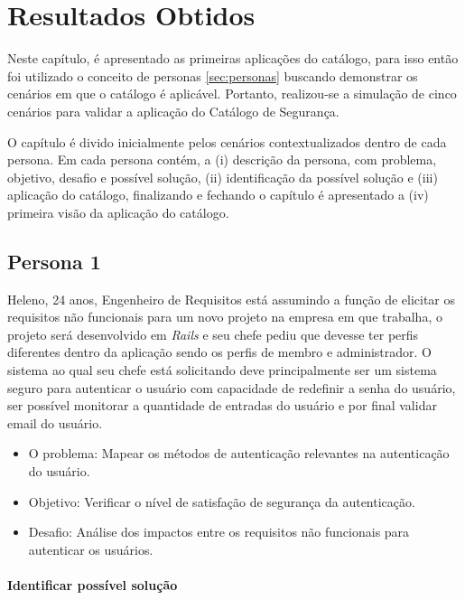 \chapter{Resultados Obtidos}
\label{chap:resultados obtidos}

Neste capítulo, é apresentado as primeiras aplicações do catálogo, para isso então foi utilizado o conceito de personas \ref{sec:personas} buscando demonstrar os cenários em que o catálogo é aplicável. Portanto, realizou-se a simulação de cinco cenários para validar a aplicação do Catálogo de Segurança. 

O capítulo é divido inicialmente pelos cenários contextualizados dentro de cada persona. Em cada persona contém, a (i) descrição da persona, com problema, objetivo, desafio e possível solução, (ii) identificação da possível solução e (iii) aplicação do catálogo, finalizando e fechando o capítulo é apresentado a (iv) primeira visão da aplicação do catálogo.  


\section{Persona 1}

Heleno, 24 anos, Engenheiro de Requisitos está assumindo a função de elicitar os requisitos não funcionais para um novo projeto na empresa em que trabalha, o projeto será desenvolvido em \textit{Rails} e seu chefe pediu que devesse ter perfis diferentes dentro da aplicação sendo os perfis de membro e administrador. O sistema ao qual seu chefe está solicitando deve principalmente ser um sistema seguro para autenticar o usuário com capacidade de redefinir a senha do usuário, ser possível monitorar a quantidade de entradas do usuário e por final validar email do usuário.

\begin{itemize}
	\item O problema: Mapear os métodos de autenticação relevantes na autenticação do usuário. 
	\item Objetivo: Verificar o nível de satisfação de segurança da autenticação. 
	\item Desafio: Análise dos impactos entre os requisitos não funcionais para autenticar os usuários.
\end{itemize}


\subsubsection{Identificar possível solução}

